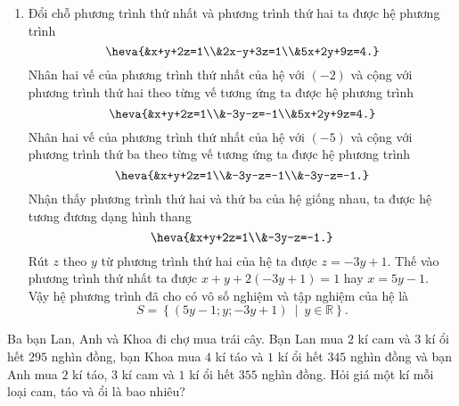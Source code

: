 \begin{vd}
{\begin{enumerate}
		Vậy hệ phương trình đã cho vô nghiệm.
		\item Đổi chỗ phương trình thứ nhất và phương trình thứ hai ta được hệ phương trình 
		\[\heva{&x+y+2z=1\\&2x-y+3z=1\\&5x+2y+9z=4.}\]
		Nhân hai vế của phương trình thứ nhất của hệ với $(-2)$ và cộng với phương trình thứ hai theo từng vế tương ứng ta được hệ phương trình 
		\[\heva{&x+y+2z=1\\&-3y-z=-1\\&5x+2y+9z=4.}\]
		Nhân hai vế của phương trình thứ nhất của hệ với $(-5)$ và cộng với phương trình thứ ba theo từng vế tương ứng ta được hệ phương trình 
		\[\heva{&x+y+2z=1\\&-3y-z=-1\\&-3y-z=-1.}\]
		Nhận thấy phương trình thứ hai và thứ ba của hệ giống nhau, ta được hệ tương đương dạng hình thang
		\[\heva{&x+y+2z=1\\&-3y-z=-1.}\]
		Rút $z$ theo $y$ từ phương trình thứ hai của hệ ta được $z=-3y+1$. Thế vào phương trình thứ nhất ta được $x+y+2(-3y+1)=1$ hay $x=5y-1$.\\
		Vậy hệ phương trình đã cho có vô số nghiệm và tập nghiệm của hệ là \[ S=\left\{(5y-1;y;-3y+1)\ \middle | \ y\in\mathbb{R}\right\}.\]
	\end{enumerate}	
}
\end{vd}
\begin{vd}%
	Ba bạn Lan, Anh và Khoa đi chợ mua trái cây. Bạn Lan mua $2$ kí cam và $3$ kí ổi hết $295$ nghìn đồng, bạn Khoa mua $4$ kí táo và $1$ kí ổi hết $345$ nghìn đồng và bạn Anh mua $2$ kí táo, $3$ kí cam và $1$ kí ổi hết $355$ nghìn đồng. Hỏi giá một kí mỗi loại cam, táo và ổi là bao nhiêu? 
\end{vd}

